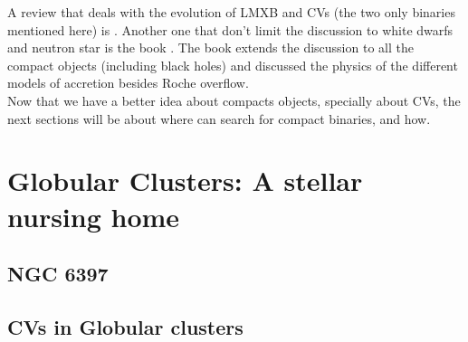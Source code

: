A review that deals with the evolution of LMXB and CVs (the two only binaries mentioned here) is \cite{patterson_evolution_1984}. Another one that don't limit the discussion to white dwarfs and neutron star is the book \cite{frank_accretion_2002}. The book extends the discussion to all the compact objects (including black holes) and discussed the physics of the different models of accretion besides Roche overflow. \\ 

Now that we have a better idea about compacts objects, specially about CVs, the next sections will be about where can search for compact binaries, and how. \\ 

\section{Globular Clusters: A stellar nursing home}\label{sec:gc}

%

\subsection{NGC 6397}



\subsection{CVs in Globular clusters}\label{sec:cogc}



